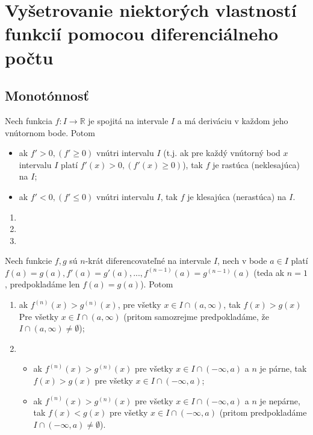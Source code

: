 \section{Vyšetrovanie niektorých vlastností funkcií pomocou diferenciálneho počtu}

\subsection{Monotónnosť}
\begin{veta}
Nech funkcia $f: I \rightarrow\mathbb{R}$ je spojitá na intervale $I$ a má deriváciu v každom jeho vnútornom bode. Potom
\begin{itemize}
\item ak $f'>0,(f'\geq 0)$ vnútri intervalu $I$ (t.j. ak pre každý vnútorný bod $x$ intervalu $I$ platí $f'(x)>0,(f'(x)\geq 0)$), tak $f$ je rastúca (neklesajúca) na $I$;
\item ak $f'<0,(f'\leq 0)$ vnútri intervalu $I$, tak $f$ je klesajúca (nerastúca) na $I$.
\end{itemize}
\end{veta}

\begin{enumerate}[resume]
	\item {}
	\item {}
	\item {}
\end{enumerate}

\begin{veta}
Nech funkcie $f,g$ sú $n$-krát diferencovateľné na intervale $I$, nech v bode $a\in I$ platí $f(a)=g(a),f'(a)=g'(a),...,f^{(n-1)}(a)=g^{(n-1)}(a)$ (teda ak $n=1$, predpokladáme len $f(a)=g(a)$). Potom
\begin{enumerate}
\item ak $f^{(n)}(x)>g^{(n)}(x)$, pre všetky $x\in I \cap (a,\infty)$, tak $f(x)>g(x)$ Pre všetky $x\in I \cap (a,\infty)$ (pritom samozrejme predpokladáme, že $I \cap (a,\infty)\neq \emptyset$);
\item
\begin{itemize}
\item ak $f^{(n)}(x)>g^{(n)}(x)$ pre všetky $x\in I \cap (-\infty,a)$ a $n$ je párne, tak $f(x)>g(x)$ pre všetky $x\in I \cap (-\infty,a)$;
\item ak $f^{(n)}(x)>g^{(n)}(x)$ pre všetky $x\in I \cap (-\infty,a)$ a $n$ je nepárne, tak $f(x)<g(x)$ pre všetky $x\in I \cap (-\infty,a)$ (pritom predpokladáme $I \cap (-\infty,a)\neq \emptyset$).
\end{itemize}
\end{enumerate}
\end{veta}

